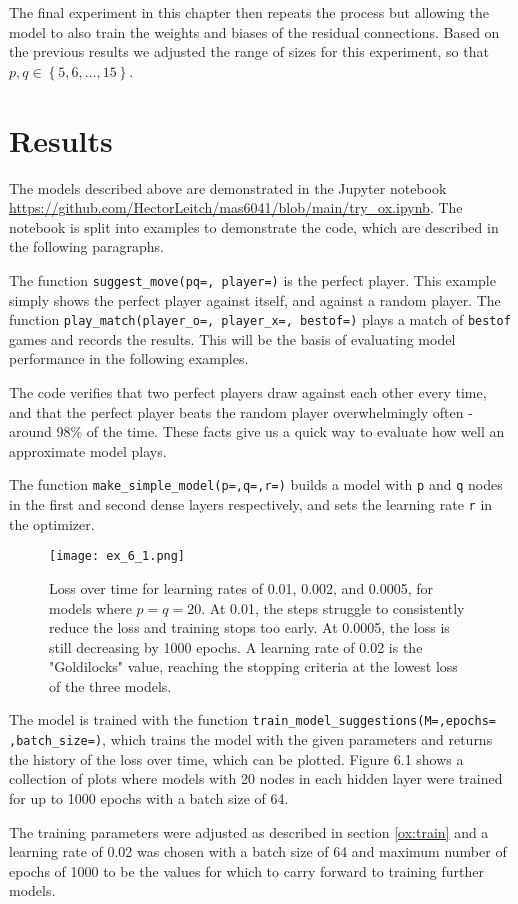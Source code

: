 \documentclass{somasmsc}
\begin{document}
The final experiment in this chapter then repeats the process but allowing the model to also train the weights and biases of the residual connections. Based on the previous results we adjusted the range of sizes for this experiment, so that $p,q \in \left\{5, 6, \dots, 15\right\}$.


\section{Results}

The models described above are demonstrated in the Jupyter notebook \url{https://github.com/HectorLeitch/mas6041/blob/main/try_ox.ipynb}. The notebook is split into examples to demonstrate the code, which are described in the following paragraphs.


\begin{exa}
The function \verb|suggest_move(pq=, player=)| is the perfect player. This example simply shows the perfect player against itself, and against a random player. The function \verb|play_match(player_o=, player_x=, bestof=)| plays a match of \verb|bestof| games and records the results. This will be the basis of evaluating model performance in the following examples.

The code verifies that two perfect players draw against each other every time, and that the perfect player beats the random player overwhelmingly often - around 98\% of the time. These facts give us a quick way to evaluate how well an approximate model plays.
\end{exa}

\begin{exa}
The function \verb|make_simple_model(p=,q=,r=)| builds a model with \verb|p| and \verb|q| nodes in the first and second dense layers respectively, and sets the learning rate \verb|r| in the optimizer.

\begin{figure}[H]\label{ox:ex_6_1}
\begin{center}
\texttt{[image: ex\_6\_1.png]}
\end{center}
\caption{Loss over time for learning rates of 0.01, 0.002, and 0.0005, for models where $p=q=20$. At 0.01, the steps struggle to consistently reduce the loss and training stops too early. At 0.0005, the loss is still decreasing by 1000 epochs. A learning rate of 0.02 is the "Goldilocks" value, reaching the stopping criteria at the lowest loss of the three models.}
\end{figure}

The model is trained with the function \verb|train_model_suggestions(M=,epochs=|
\verb|,batch_size=)|, which trains the model with the given parameters and returns the history of the loss over time, which can be plotted. Figure 6.1 shows a collection of plots where models with 20 nodes in each hidden layer were trained for up to 1000 epochs with a batch size of 64.

The training parameters were adjusted as described in section \ref{ox:train} and a learning rate of 0.02 was chosen with a batch size of 64 and maximum number of epochs of 1000 to be the values for which to carry forward to training further models.
\end{exa}
\end{document}

